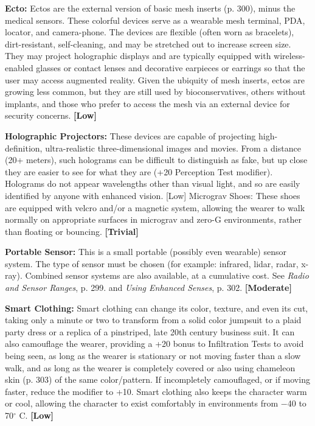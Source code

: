 \textbf{Ecto:} Ectos are the external version of basic mesh inserts (p. 300), minus the medical sensors. These colorful devices serve as a wearable mesh terminal, PDA, locator, and camera-phone. The devices are flexible (often worn as bracelets), dirt-resistant, self-cleaning, and may be stretched out to increase screen size. They may project holographic displays and are typically equipped with wireless-enabled glasses or contact lenses and decorative earpieces or earrings so that the user may access augmented reality. Given the ubiquity of mesh inserts, ectos are growing less common, but they are still used by bioconservatives, others without implants, and those who prefer to access the mesh via an external device for security concerns. \textbf{[Low]}

\textbf{Holographic Projectors:} These devices are capable of projecting high-definition, ultra-realistic three-dimensional images and movies. From a distance (20+ meters), such holograms can be difficult to distinguish as fake, but up close they are easier to see for what they are (+20 Perception Test modifier). Holograms do not appear wavelengths other than visual light, and so are easily identified by anyone with enhanced vision. [Low] Micrograv Shoes: These shoes are equipped with velcro and/or a magnetic system, allowing the wearer to walk normally on appropriate surfaces in micrograv and zero-G environments, rather than floating or bouncing. \textbf{[Trivial]}

\textbf{Portable Sensor:} This is a small portable (possibly even wearable) sensor system. The type of sensor must be chosen (for example: infrared, lidar, radar, x-ray). Combined sensor systems are also available, at a cumulative cost. See \emph{Radio and Sensor Ranges}, p. 299. and \emph{Using Enhanced Senses}, p. 302. \textbf{[Moderate]}

\textbf{Smart Clothing:} Smart clothing can change its color, texture, and even its cut, taking only a minute or two to transform from a solid color jumpsuit to a plaid party dress or a replica of a pinstriped, late 20th century business suit. It can also camouflage the wearer, providing a +20 bonus to Infiltration Tests to avoid being seen, as long as the wearer is stationary or not moving faster than a slow walk, and as long as the wearer is completely covered or also using chameleon skin (p. 303) of the same color/pattern. If incompletely camouflaged, or if moving faster, reduce the modifier to +10. Smart clothing also keeps the character warm or cool, allowing the character to exist comfortably in environments from $-$40 to 70$^{\circ}$ C. \textbf{[Low]}


